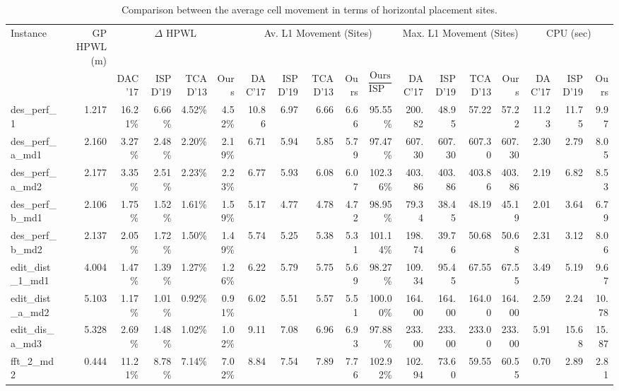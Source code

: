 \begin{table*}[t]
    \caption{Comparison between the average cell movement in terms of horizontal placement sites.}\label{TableAvMovement}
    \begin{center}
     \begin{tabular}{|l|r|rrrr|rrrrr|rrrr|rrr|}
     \toprule
     Instance & GP HPWL (m)& \multicolumn{4}{c|}{$\Delta$ HPWL} & \multicolumn{5}{c|}{Av. L1 Movement (Sites)} & \multicolumn{4}{c|}{Max. L1 Movement (Sites)} & \multicolumn{3}{c|}{CPU (sec)} \\
     & & DAC'17 & ISPD'19 & TCAD'13 & Ours & DAC'17 & ISPD'19 & TCAD'13 & Ours & $\dfrac{\text{Ours}}{\text{ISPD'19}}$ & DAC'17 & ISPD'19 & TCAD'13 & Ours & DAC'17 & ISPD'19  & Ours\\
     \midrule
     des\_perf\_1	& 1.217	& 16.21\%	& 6.66\%	& 4.52\%	& 4.52\%	& 10.86	& 6.97	& 6.66	& 6.66	& 95.55\%	& 200.82	& 48.95	& 57.22	& 57.22	& 11.23	& 11.75	& 9.97 \\
    des\_perf\_ a\_md1	& 2.160	& 3.27\%	& 2.48\%	& 2.20\%	& 2.19\%	& 6.71	& 5.94	& 5.85	& 5.79	& 97.47\%	& 607.30	& 607.30	& 607.30	& 607.30	& 2.30	& 2.79	& 8.05\\
   des\_perf\_a\_md2	& 2.177	& 3.35\%	& 2.51\%	& 2.23\%	& 2.23\%	& 6.77	& 5.93	& 6.08	& 6.07	& 102.36\%	& 403.86	& 403.86	& 403.86	& 403.86	& 2.19	& 6.82	& 8.53\\
   des\_perf\_b\_md1	& 2.106	& 1.75\%	& 1.52\%	& 1.61\%	& 1.59\%	& 5.17	& 4.77	& 4.78	& 4.72	& 98.95\%	& 79.34	& 38.45	& 48.19	& 45.19	& 2.01	& 3.64	& 6.79\\
   des\_perf\_b\_md2	& 2.137	& 2.05\%	& 1.72\%	& 1.50\%	& 1.49\%	& 5.74	& 5.25	& 5.38	& 5.31	& 101.14\%	& 198.74	& 39.76	& 50.68	& 50.68	& 2.31	& 3.12	& 8.06\\
   edit\_dist\_1\_md1	& 4.004	& 1.47\%	& 1.39\%	& 1.27\%	& 1.26\%	& 6.22	& 5.79	& 5.75	& 5.69	& 98.27\%	& 109.34	& 95.45	& 67.55	& 67.55	& 3.49	& 5.19	& 9.67\\
   edit\_dist\_a\_md2	& 5.103	& 1.17\%	& 1.01\%	& 0.92\%	& 0.91\%	& 6.02	& 5.51	& 5.57	& 5.51	& 100.00\%	& 164.00	& 164.00	& 164.00	& 164.00	& 2.59	& 2.24	& 10.78\\
   edit\_dis\_ a\_md3	& 5.328	& 2.69\%	& 1.48\%	& 1.02\%	& 1.02\%	& 9.11	& 7.08	& 6.96	& 6.93	& 97.88\%	& 233.00	& 233.00	& 233.00	& 233.00	& 5.91	& 15.68	& 15.87\\
   fft\_2\_md2	& 0.444	& 11.21\%	& 8.78\%	& 7.14\%	& 7.02\%	& 8.84	& 7.54	& 7.89	& 7.76	& 102.92\%	& 102.94	& 73.60	& 59.55	& 60.55	& 0.70	& 2.89	& 2.81\\

\end{tabular}
\end{center}
\end{table*}
